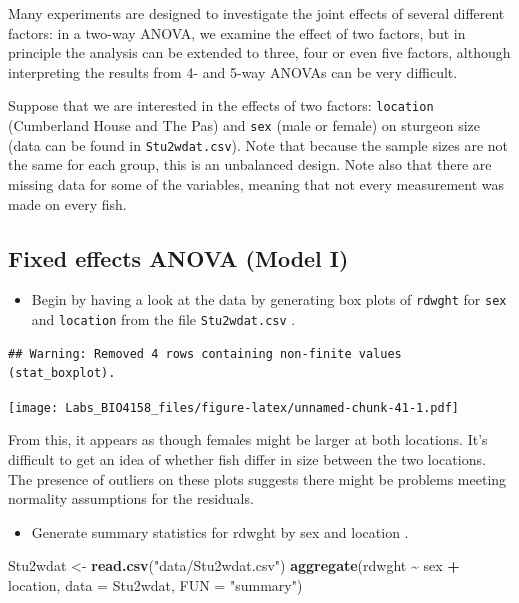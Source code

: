 \documentclass[
  12pt,
]{book}
\newenvironment{Shaded}{\begin{snugshade}}{\end{snugshade}}
\newcommand{\DataTypeTok}[1]{\textcolor[rgb]{0.13,0.29,0.53}{#1}}
\newcommand{\KeywordTok}[1]{\textcolor[rgb]{0.13,0.29,0.53}{\textbf{#1}}}
\newcommand{\NormalTok}[1]{#1}
\newcommand{\OperatorTok}[1]{\textcolor[rgb]{0.81,0.36,0.00}{\textbf{#1}}}
\newcommand{\StringTok}[1]{\textcolor[rgb]{0.31,0.60,0.02}{#1}}
\providecommand{\tightlist}{%
  \setlength{\itemsep}{0pt}\setlength{\parskip}{0pt}}
\begin{document}
Many experiments are designed to investigate the joint effects of several different factors: in a two-way ANOVA, we examine the effect of two factors, but in principle the analysis can be extended to three, four or even five factors, although interpreting the results from 4- and 5-way ANOVAs can be very difficult.

Suppose that we are interested in the effects of two factors: \texttt{location} (Cumberland House and The Pas) and \texttt{sex} (male or female) on sturgeon size (data can be found in \texttt{Stu2wdat.csv}). Note that because the sample sizes are not the same for each group, this is an unbalanced design. Note also that there are missing data for some of the variables, meaning that not every measurement was made on every fish.

\hypertarget{fixed-effects-anova-model-i}{%
\subsection{Fixed effects ANOVA (Model I)}\label{fixed-effects-anova-model-i}}

\begin{itemize}
\tightlist
\item
  Begin by having a look at the data by generating box plots of \texttt{rdwght} for \texttt{sex} and \texttt{location} from the file \texttt{Stu2wdat.csv} .
\end{itemize}

\begin{verbatim}
## Warning: Removed 4 rows containing non-finite values (stat_boxplot).
\end{verbatim}

\texttt{[image: Labs\_BIO4158\_files/figure-latex/unnamed-chunk-41-1.pdf]}

From this, it appears as though females might be larger at both locations. It's difficult to get an idea of whether fish differ in size between the two locations. The presence of outliers on these plots suggests there might be problems meeting normality assumptions for the residuals.

\begin{itemize}
\tightlist
\item
  Generate summary statistics for rdwght by sex and location .
\end{itemize}

\begin{Shaded}
\begin{Highlighting}[]
\NormalTok{Stu2wdat \textless{}{-}}\StringTok{ }\KeywordTok{read.csv}\NormalTok{(}\StringTok{"data/Stu2wdat.csv"}\NormalTok{)}
\KeywordTok{aggregate}\NormalTok{(rdwght }\OperatorTok{\textasciitilde{}}\StringTok{ }\NormalTok{sex }\OperatorTok{+}\StringTok{ }\NormalTok{location, }\DataTypeTok{data =}\NormalTok{ Stu2wdat, }\DataTypeTok{FUN =} \StringTok{"summary"}\NormalTok{)}
\end{Highlighting}
\end{Shaded}
\end{document}
